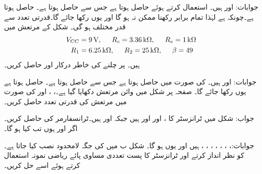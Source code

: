 جوابات: اور  ہیں۔ استعمال کرتے ہوئے حاصل ہوتا ہے جس سے  حاصل ہوتا ہے۔ حاصل ہوتا ہے۔چونکہ  ہے لہٰذا تمام  برابر رکھنا ممکن نہ ہو گا اور یوں  رکھا جائے گا۔قدرتی تعدد  سے قدر مختلف ہو گی۔
شکل  کے  مرتعش میں
\begin{align*}
V_{CC}&=\SI{9}{\volt}, \hspace{5mm} R_c=\SI{3.36}{\kilo \ohm}, \hspace{5mm} R_e=\SI{1}{\kilo \ohm}\\
R_1&=\SI{6.25}{\kilo \ohm}, \hspace{5mm} R_2=\SI{25}{\kilo \ohm}, \hspace{5mm} \beta=49
\end{align*}
ہیں۔ پر چلنے کی خاطر درکار  اور  حاصل کریں۔

جوابات: اور  ہیں۔ کی صورت میں  حاصل ہوتا ہے جس سے  حاصل ہوتا ہے۔ حاصل ہوتا ہے  یوں  رکھا جائے گا۔
صفحہ  پر شکل  میں وائن مرتعش دکھایا گیا ہے۔، ،  اور  کی صورت میں مرتعش کی قدرتی تعدد حاصل کریں۔

جواب:
شکل  میں ٹرانزسٹر کا ،  اور  اور  ہیں جبکہ  اور  ہیں۔ٹرانسفارمر کی  حاصل کریں۔اگر  اور  ہوں تب  کیا ہو گا۔

جوابات:، ، ، ، ، ، ،  ہیں اور یوں  ہو گا۔
شکل  ب میں  کی جگہ لامحدود  نصب کیا جاتا ہے۔ کو نظر انداز کرتے اور ٹرانزسٹر کا پست تعددی مساوی پائے ریاضی نمونہ استعمال کرتے ہوئے اسے حل کریں۔

